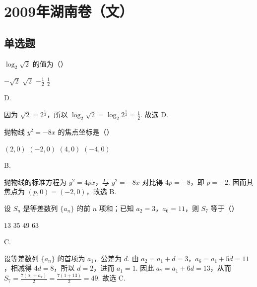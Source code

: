 \chapter{2009年湖南卷（文）}

\section{单选题}

\begin{problem}
\(\log_2\sqrt{2}\) 的值为（\quad）

\choices
    {\(-\sqrt{2}\)}
    {\(\sqrt{2}\)}
    {\(-\frac{1}{2}\)}
    {\(\frac{1}{2}\)}
\end{problem}

\begin{answer}
D.
\end{answer}

\begin{solution}
因为 \(\sqrt{2}=2^{\frac{1}{2}}\)，所以 \(\log_{2}\sqrt{2}=\log_{2}2^{\frac{1}{2}}=\frac{1}{2}\).
故选 D.
\end{solution}

\begin{problem}
抛物线 \( y^2 = -8x \) 的焦点坐标是（\quad）

\choices
    {\((2,0)\)}
    {\((-2, 0)\)}
    {\((4,0)\)}
    {\((-4,0)\)}
\end{problem}

\begin{answer}
B.
\end{answer}

\begin{solution}
抛物线的标准方程为 \(y^2=4px\)，与 \(y^2=-8x\) 对比得 \(4p=-8\)，即 \(p=-2\). 因而其焦点为 \((p,0)=(-2,0)\)，故选 B.
\end{solution}

\begin{problem}
设 \(S_{n}\) 是等差数列 \(\{a_{n}\}\) 的前 \(n\) 项和；已知 \(a_{2} = 3\)，\(a_{6} = 11\)，则 \(S_{7}\) 等于（\quad）

\choices
    {\(13\)}
    {\(35\)}
    {\(49\)}
    {\(63\)}
\end{problem}

\begin{answer}
C.
\end{answer}

\begin{solution}
设等差数列 \(\{a_n\}\) 的首项为 \(a_1\)，公差为 \(d\). 由
\(a_2=a_1+d=3\)，\(a_6=a_1+5d=11\)，相减得 \(4d=8\)，所以 \(d=2\)，进而 \(a_1=1\). 因此
\(a_7=a_1+6d=13\)，从而 \(S_7=\frac{7(a_1+a_7)}{2}=\frac{7(1+13)}{2}=49\).
故选 C.
\end{solution}

